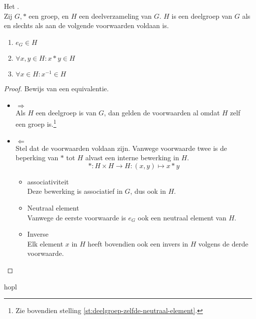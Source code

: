 \documentclass[main.tex]{subfiles}
\begin{document}
\begin{st}
  \label{st:criterium-deelgroep}
  Het .\\
  Zij $G,*$ een groep, en $H$ een deelverzameling van $G$.
  $H$ is een deelgroep van $G$ als en slechts als aan de volgende voorwaarden voldaan is.
  \begin{enumerate}
  \item $e_{G} \in H$
  \item $\forall x,y \in H: x * y \in H$
  \item $\forall x \in H: x^{-1} \in H$
  \end{enumerate}

  \begin{proof}
    Bewijs van een equivalentie.
    \begin{itemize}
    \item $\Rightarrow$\\
      Als $H$ een deelgroep is van $G$, dan gelden de voorwaarden al omdat $H$ zelf een groep is.\footnote{Zie bovendien stelling \ref{st:deelgroep-zelfde-neutraal-element}.}
    \item $\Leftarrow$\\
      Stel dat de voorwaarden voldaan zijn. Vanwege voorwaarde twee is de beperking van $*$ tot $H$ alvast een interne bewerking in $H$.
      \[ *: H \times H \rightarrow H: (x,y) \mapsto x*y \]
      \begin{itemize}
      \item associativiteit\\
      Deze bewerking is associatief in $G$, dus ook in $H$.
      \item Neutraal element\\
      Vanwege de eerste voorwaarde is $e_{G}$ ook een neutraal element van $H$.
      \item Inverse\\
      Elk element $x$ in $H$ heeft bovendien ook een invers in $H$ volgens de derde voorwaarde.
      \end{itemize}
    \end{itemize}
  \end{proof}
\end{st}
hopl
\end{document}
